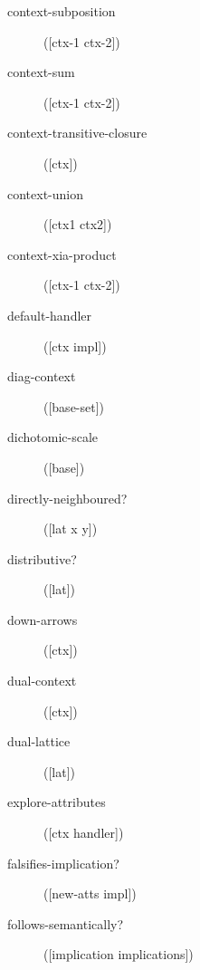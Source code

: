 \begin{description}
  \item[context-subposition]
([ctx-1 ctx-2])



  \item[context-sum]
([ctx-1 ctx-2])



  \item[context-transitive-closure]
([ctx])



  \item[context-union]
([ctx1 ctx2])



  \item[context-xia-product]
([ctx-1 ctx-2])



  \item[default-handler]
([ctx impl])



  \item[diag-context]
([base-set])



  \item[dichotomic-scale]
([base])



  \item[directly-neighboured?]
([lat x y])



  \item[distributive?]
([lat])



  \item[down-arrows]
([ctx])



  \item[dual-context]
([ctx])



  \item[dual-lattice]
([lat])



  \item[explore-attributes]
([ctx handler])



  \item[falsifies-implication?]
([new-atts impl])



  \item[follows-semantically?]
([implication implications])




\end{description}
